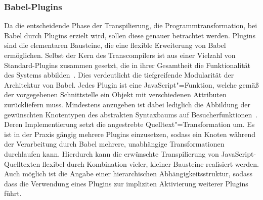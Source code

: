 \subsubsection{Babel-Plugins}
\label{subsec:babel-plugins}

Da die entscheidende Phase der Transpilierung, die Programmtransformation, bei Babel durch Plugins erzielt wird, sollen diese genauer betrachtet werden. Plugins sind die elementaren Bausteine, die eine flexible Erweiterung von Babel ermöglichen. Selbst der Kern des Transcompilers ist aus einer Vielzahl von Standard-Plugins zusammen gesetzt, die in ihrer Gesamtheit die Funktionalität des Systems abbilden~\autocite{BABEL}. Dies verdeutlicht die tiefgreifende Modularität der Architektur von Babel. Jedes Plugin ist eine JavaScript"=Funktion, welche gemäß der vorgegebenen Schnittstelle ein Objekt mit verschiedenen Attributen zurückliefern muss. Mindestens anzugeben ist dabei lediglich die Abbildung der gewünschten Knotentypen des abstrakten Syntaxbaums auf Besucherfunktionen~\autocite{BABEL:HANDBOOK}. Deren Implementierung setzt die angestrebte Quelltext"=Transformation um. Es ist in der Praxis gängig mehrere Plugins einzusetzen, sodass ein Knoten während der Verarbeitung durch Babel mehrere, unabhängige Transformationen durchlaufen kann. Hierdurch kann die erwünschte Transpilierung von JavaScript-Quelltexten flexibel durch Kombination vieler, kleiner Bausteine realisiert werden. Auch möglich ist die Angabe einer hierarchischen Abhängigkeitsstruktur, sodass dass die Verwendung eines Plugins zur impliziten Aktivierung weiterer Plugins führt.

